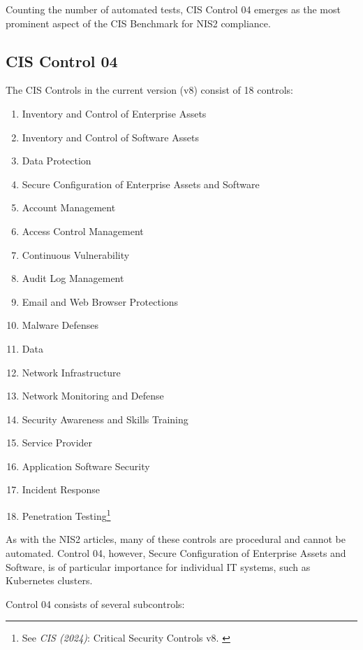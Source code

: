 Counting the number of automated tests, CIS Control 04 emerges as the most prominent aspect of the CIS Benchmark for NIS2 compliance.

\pagebreak

\subsection{CIS Control 04}

The CIS Controls in the current version (v8) consist of 18 controls:

\begin{enumerate}
    \item Inventory and Control of Enterprise Assets
    \item Inventory and Control of Software Assets
    \item Data Protection
    \item Secure Configuration of Enterprise Assets and Software
    \item Account Management
    \item Access Control Management
    \item Continuous Vulnerability
    \item Audit Log Management
    \item Email and Web Browser Protections
    \item Malware Defenses
    \item Data
    \item Network Infrastructure
    \item Network Monitoring and Defense
    \item Security Awareness and Skills Training
    \item Service Provider
    \item Application Software Security
    \item Incident Response
    \item Penetration Testing\footnote{See \textit{CIS (2024)}: Critical Security Controls v8. \cite{cisControls}}
\end{enumerate}

As with the NIS2 articles, many of these controls are procedural and cannot be automated. Control 04, however, Secure Configuration of Enterprise Assets and Software, is of particular importance for individual IT systems, such as Kubernetes clusters.

Control 04 consists of several subcontrols:

